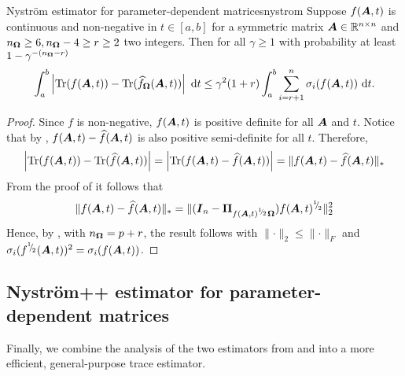 \documentclass[12pt]{article}
\begin{document}
\begin{theorem}{Nyström estimator for parameter-dependent matrices}{nystrom}
    Suppose $f(\boldsymbol{A}, t)$ is continuous and non-negative in $t \in [a, b]$ for a symmetric matrix $\boldsymbol{A} \in \mathbb{R}^{n \times n}$ and $n_{\boldsymbol{\Omega}} \geq 6, n_{\boldsymbol{\Omega}} - 4 \geq r \geq 2$ two integers. Then for all $\gamma \geq 1$ with probability at least $1 - \gamma^{-(n_{\boldsymbol{\Omega}} - r)}$
    \begin{equation}
        \int_{a}^{b} \left| \operatorname{Tr}(f(\boldsymbol{A}, t)) - \operatorname{Tr}(\widehat{f}_{\boldsymbol{\Omega}}(\boldsymbol{A}, t)) \right| ~\mathrm{d}t
        \leq \gamma^2 (1 + r) \int_{a}^{b} \sum_{i = r+1}^{n} \sigma_i(f(\boldsymbol{A}, t)) ~\mathrm{d}t.
    \end{equation}
\end{theorem}

\begin{proof}
    Since $f$ is non-negative, $f(\boldsymbol{A}, t)$ is positive definite for all $\boldsymbol{A}$ and $t$.
    Notice that by \cite[Lemma 2.1]{frangella-2023-randomized-nystrom}, $f(\boldsymbol{A}, t) - \widehat{f}(\boldsymbol{A}, t)$ is also positive semi-definite for all $t$. Therefore,
    \begin{equation}
        \left| \operatorname{Tr}(f(\boldsymbol{A}, t)) - \operatorname{Tr}(\widehat{f}(\boldsymbol{A}, t)) \right|
        = \left| \operatorname{Tr}(f(\boldsymbol{A}, t) - \widehat{f}(\boldsymbol{A}, t)) \right|
        = \lVert f(\boldsymbol{A}, t) - \widehat{f}(\boldsymbol{A}, t) \rVert _{\ast}
    \end{equation}
    From the proof of \cite[Corollary 8.2]{tropp-2023-randomized-algorithms} it follows that
    \begin{equation}
        \lVert f(\boldsymbol{A}, t) - \widehat{f}(\boldsymbol{A}, t) \rVert _{\ast} = \lVert (\boldsymbol{I}_n - \boldsymbol{\Pi}_{f(\boldsymbol{A}, t)^{{}^{1}{\mskip -5mu/\mskip -3mu}_{2}} \boldsymbol{\Omega}}) f(\boldsymbol{A}, t)^{{}^{1}{\mskip -5mu/\mskip -3mu}_{2}} \rVert _2^2
    \end{equation}
    Hence, by \cite[Theorem 9]{kressner-2023-randomized-lowrank}, with $n_{\boldsymbol{\Omega}} = p + r$, the result follows
    with $\lVert \cdot \rVert _2 \leq \lVert \cdot \rVert _F$ and $\sigma_i(f^{{}^{1}{\mskip -5mu/\mskip -3mu}_{2}}(\boldsymbol{A}, t))^{2} = \sigma_i(f(\boldsymbol{A}, t))$.
\end{proof}

\subsection{Nyström++ estimator for parameter-dependent matrices}
\label{subsec:nystrom-pp}

Finally, we combine the analysis of the two estimators from  and  into a more efficient, general-purpose trace estimator.
\end{document}
